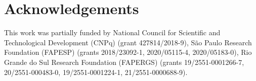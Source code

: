 
\section*{Acknowledgements}


This work was partially funded by National Council for Scientific and Technological Development (CNPq) (grant 427814/2018-9), São Paulo Research Foundation (FAPESP) (grants 2018/23092-1, 2020/05115-4, 2020/05183-0), Rio Grande do Sul Research Foundation (FAPERGS) (grants 19/2551-0001266-7, 20/2551-000483-0, 19/2551-0001224-1, 21/2551-0000688-9).